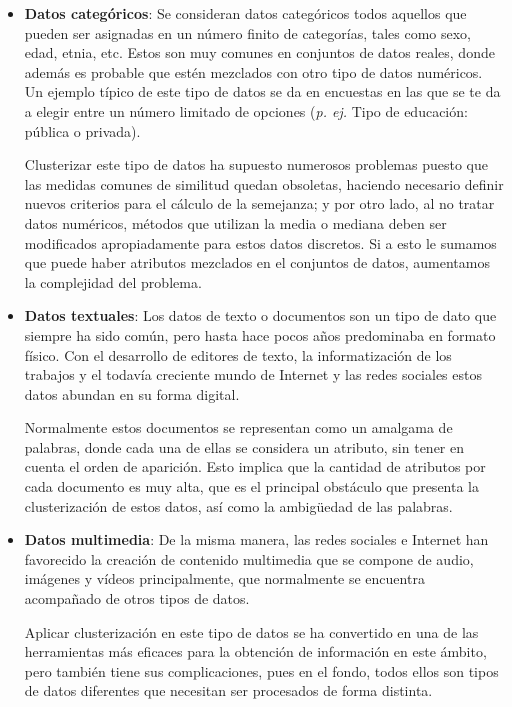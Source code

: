 \documentclass[10pt, a4paper]{article}
\begin{document}
\begin{itemize}
  \item \textbf{Datos categóricos}: Se consideran datos categóricos todos aquellos que pueden ser asignadas en un número finito de categorías, tales como sexo, edad, etnia, etc. Estos son muy comunes en conjuntos de datos reales, donde además es probable que estén mezclados con otro tipo de datos numéricos.  Un ejemplo típico de este tipo de datos se da en encuestas en las que se te da a elegir entre un número limitado de opciones (\textit{p. ej.} Tipo de educación: pública o privada).
  
  Clusterizar este tipo de datos ha supuesto numerosos problemas puesto que las medidas comunes de similitud quedan obsoletas, haciendo necesario definir nuevos criterios para el cálculo de la semejanza; y por otro lado, al no tratar datos numéricos, métodos que utilizan la media o mediana deben ser modificados apropiadamente para estos datos discretos. Si a esto le sumamos que puede haber atributos mezclados en el conjuntos de datos, aumentamos la complejidad del problema.
  
  \item \textbf{Datos textuales}: Los datos de texto o documentos son un tipo de dato que siempre ha sido común, pero hasta hace pocos años predominaba en formato físico. Con el desarrollo de editores de texto, la informatización de los trabajos y el todavía creciente mundo de Internet y las redes sociales estos datos abundan en su forma digital.
  
  Normalmente estos documentos se representan como un amalgama de palabras, donde cada una de ellas se considera un atributo, sin tener en cuenta el orden de aparición. Esto implica que la cantidad de atributos por cada documento es muy alta, que es el principal obstáculo que presenta la clusterización de estos datos, así como la ambigüedad de las palabras. 
  
  \item \textbf{Datos multimedia}: De la misma manera, las redes sociales e Internet han favorecido la creación de contenido multimedia que se compone de audio, imágenes y vídeos principalmente, que normalmente se encuentra acompañado de otros tipos de datos.
  
  Aplicar clusterización en este tipo de datos se ha convertido en una de las herramientas más eficaces para la obtención de información en este ámbito, pero también tiene sus complicaciones, pues en el fondo, todos ellos son tipos de datos diferentes que necesitan ser procesados de forma distinta.
  

\end{itemize}
\end{document}

